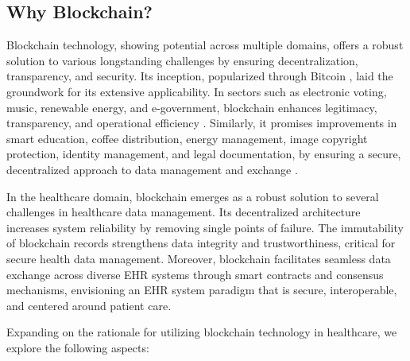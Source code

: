 \documentclass[12pt]{report}
\begin{document}
\subsection{Why Blockchain?}

Blockchain technology, showing potential across multiple domains, offers a robust solution to various longstanding challenges by ensuring decentralization, transparency, and security. Its inception, popularized through Bitcoin \cite{nakamoto2008bitcoin}, laid the groundwork for its extensive applicability. In sectors such as electronic voting, music, renewable energy, and e-government, blockchain enhances legitimacy, transparency, and operational efficiency \cite{BlockchainVotingJafar2021, BlockchainMusicChavan2019, BlockchainRenewableEnergyGorski2022, BlockchainEgovernmentWang2022}. Similarly, it promises improvements in smart education, coffee distribution, energy management, image copyright protection, identity management, and legal documentation, by ensuring a secure, decentralized approach to data management and exchange \cite{BlockchainSmartEducationDubey2023, BlockchainCoffeeDistributionInayatulloh2023, BlockchainEnergyManagementWang2023, BlockchainImageCopyrightXiao2023, BlockchainIdentity, BlockchianPoliceRecord}.

In the healthcare domain, blockchain emerges as a robust solution to several challenges in healthcare data management. Its decentralized architecture increases system reliability by removing single points of failure. The immutability of blockchain records strengthens data integrity and trustworthiness, critical for secure health data management. Moreover, blockchain facilitates seamless data exchange across diverse EHR systems through smart contracts and consensus mechanisms, envisioning an EHR system paradigm that is secure, interoperable, and centered around patient care.

Expanding on the rationale for utilizing blockchain technology in healthcare, we explore the following aspects:
\end{document}
